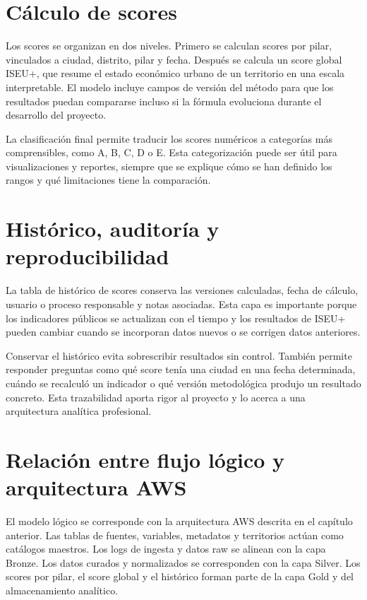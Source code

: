 \section{Cálculo de scores}

Los scores se organizan en dos niveles. Primero se calculan scores por pilar, vinculados a ciudad, distrito, pilar y fecha. Después se calcula un score global ISEU+, que resume el estado económico urbano de un territorio en una escala interpretable. El modelo incluye campos de versión del método para que los resultados puedan compararse incluso si la fórmula evoluciona durante el desarrollo del proyecto.

La clasificación final permite traducir los scores numéricos a categorías más comprensibles, como A, B, C, D o E. Esta categorización puede ser útil para visualizaciones y reportes, siempre que se explique cómo se han definido los rangos y qué limitaciones tiene la comparación.

\section{Histórico, auditoría y reproducibilidad}

La tabla de histórico de scores conserva las versiones calculadas, fecha de cálculo, usuario o proceso responsable y notas asociadas. Esta capa es importante porque los indicadores públicos se actualizan con el tiempo y los resultados de ISEU+ pueden cambiar cuando se incorporan datos nuevos o se corrigen datos anteriores.

Conservar el histórico evita sobrescribir resultados sin control. También permite responder preguntas como qué score tenía una ciudad en una fecha determinada, cuándo se recalculó un indicador o qué versión metodológica produjo un resultado concreto. Esta trazabilidad aporta rigor al proyecto y lo acerca a una arquitectura analítica profesional.

\section{Relación entre flujo lógico y arquitectura AWS}

El modelo lógico se corresponde con la arquitectura AWS descrita en el capítulo anterior. Las tablas de fuentes, variables, metadatos y territorios actúan como catálogos maestros. Los logs de ingesta y datos raw se alinean con la capa Bronze. Los datos curados y normalizados se corresponden con la capa Silver. Los scores por pilar, el score global y el histórico forman parte de la capa Gold y del almacenamiento analítico.

